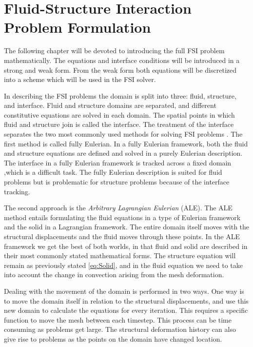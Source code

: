 \chapter{Fluid-Structure Interaction Problem Formulation}
The following chapter will be devoted to introducing the full FSI problem mathematically. The equations and interface conditions will be introduced in a strong and weak form. From the weak form both equations will be discretized into a scheme which will be used in the FSI solver. \newline

In describing the FSI problems the domain is split into three: fluid, structure, and interface. Fluid and structure domains are separated, and different constitutive equations are solved in each domain. The spatial points in which fluid and structure join is called the interface. The treatment of the interface separates the two most commonly used methods for solving FSI problems \cite{Liu2014}. The first method is called fully Eulerian. In a fully Eulerian framework, both the fluid and structure equations are defined and solved in a purely Eulerian description. The interface in a fully Eulerian framework is tracked across a fixed domain \cite{Valkov2015},which is a difficult task. The fully Eulerian description is suited for fluid problems but is problematic for structure problems because of the interface tracking. \newline

The second approach is the \textit{Arbitrary Lagrangian Eulerian} (ALE).
The ALE method entails formulating the fluid equations in a type of Eulerian framework and the solid in a Lagrangian framework. The entire domain itself moves with the structural displacements and the fluid moves through these points. In the ALE framework we get the best of both worlds, in that fluid and solid are described in their most commonly stated mathematical forms. The structure equation will remain as previously stated \eqref{eq:Solid}, and in the fluid equation we need to take into account the change in convection arising from the mesh deformation. \newline

Dealing with the movement of the domain is performed in two ways. One way is to move the domain itself in relation to the structural displacements, and use this new domain to calculate the equations for every iteration. This requires a specific function to move the mesh between each timestep. This process can be time consuming as problems get large. The structural deformation history can also give rise to problems as the points on the domain have changed location. \newline

